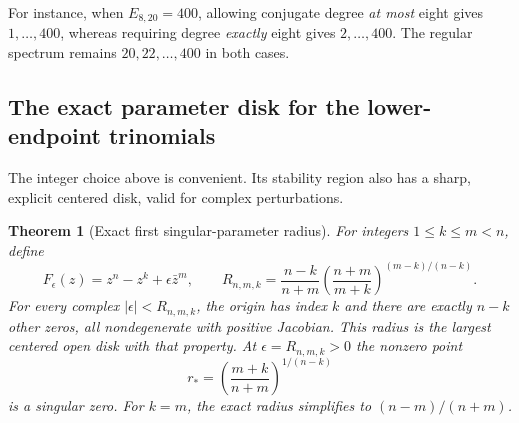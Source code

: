 \documentclass[UTF8,11pt]{ctexart}
\newtheorem{thm}{Theorem}[section]
\theoremstyle{definition}
\numberwithin{equation}{section}
\begin{document}
For instance, when $E_{8,20}=400$, allowing conjugate degree
\emph{at most} eight gives $1,\ldots,400$, whereas requiring
degree \emph{exactly} eight gives $2,\ldots,400$. The regular
spectrum remains $20,22,\ldots,400$ in both cases.

\subsection{The exact parameter disk for the lower-endpoint trinomials}
\label{v7:sec:trinomialradius}

The integer choice above is convenient. Its stability region also
has a sharp, explicit centered disk, valid for complex perturbations.

\begin{thm}[Exact first singular-parameter radius]
\label{v7:thm:trinomialradius}
For integers $1\le k\le m<n$, define
\[
 F_\epsilon(z)=z^n-z^k+\epsilon\bar z^m,\qquad
 R_{n,m,k}=\frac{n-k}{n+m}
       \left(\frac{n+m}{m+k}\right)^{(m-k)/(n-k)}.
\]
For every complex $|\epsilon|<R_{n,m,k}$, the origin has index
$k$ and there are exactly $n-k$ other zeros, all nondegenerate
with positive Jacobian. This radius is the largest centered open
disk with that property. At $\epsilon=R_{n,m,k}>0$ the nonzero
point
\begin{equation}\label{v7:eq:firstcriticalpoint}
 r_* =\left(\frac{m+k}{n+m}\right)^{1/(n-k)}
\end{equation}
is a singular zero. For $k=m$, the exact radius simplifies to
$(n-m)/(n+m)$.
\end{thm}
\end{document}
